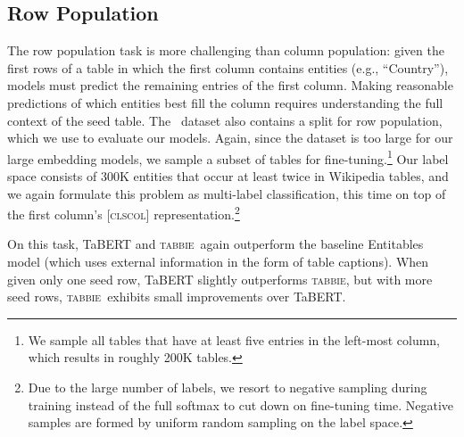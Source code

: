 \documentclass[11pt]{article}
\newcommand{\name}[0]{\textsc{tabbie}}
\begin{document}
\subsection{Row Population}
The row population task is more challenging than column population: given the first  rows of a table in which the first column contains entities (e.g., ``Country''), models must predict the remaining entries of the first column. Making reasonable predictions of which entities best fill the column requires understanding the full context of the seed table.
The~\citet{entitables} dataset also contains a split for row population, which we use to evaluate our models. Again, since the dataset is too large for our large embedding models, we sample a subset of tables for fine-tuning.\footnote{We sample all tables that have at least five entries in the left-most column, which results in roughly 200K tables.} Our label space consists of 300K entities that occur at least twice in Wikipedia tables, and we again formulate this problem as multi-label classification, this time on top of the first column's \textsc{[clscol]} representation.\footnote{Due to the large number of labels, we resort to negative sampling during training instead of the full softmax to cut down on fine-tuning time. Negative samples are formed by uniform random sampling on the label space.} 



On this task, TaBERT and \name\ again outperform the baseline Entitables model (which uses external information in the form of table captions). When given only one seed row, TaBERT slightly outperforms \name, but with more seed rows, \name\ exhibits small improvements over TaBERT. 
\end{document}
